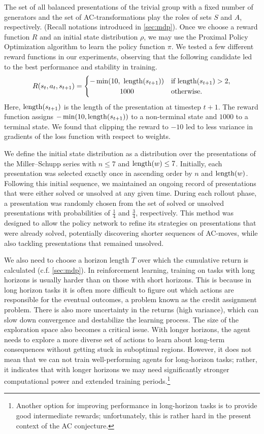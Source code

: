 The set of all balanced presentations of the trivial group with a fixed number of generators and the set of AC-transformations play the roles of sets $S$ and $A$, respectively. (Recall notations introduced in \cref{sec:mdp}). Once we choose a reward function $R$ and an initial state distribution $\rho$, we may use the Proximal Policy Optimization algorithm to learn the policy function $\pi$. We tested a few different reward functions in our experiments, observing that the following candidate led to the best performance and stability in training.
\[
R(s_{t}, a_{t}, s_{t+1}) =
\begin{cases}
	-\min(10, \ \length(s_{t+1})) & \text{if length}(s_{t+1}) > 2, \\
	\hfil 1000 & \text{otherwise.}
\end{cases}
\]
Here, $\operatorname{length}(s_{t+1})$ is the length of the presentation at timestep $t+1$. The reward function assigns $-\min(10, \operatorname{length}(s_{t+1}))$ to a non-terminal state and $1000$ to a terminal state. We found that clipping the reward to $-10$ led to less variance in gradients of the loss function with respect to weights.

We define the initial state distribution as a distribution over the presentations of the Miller--Schupp series with $n \leq 7$ and $\operatorname{length}(w) \leq 7$. Initially, each presentation was selected exactly once in ascending order by $n$ and $\operatorname{length}(w)$. Following this initial sequence, we maintained an ongoing record of presentations that were either solved or unsolved at any given time. During each rollout phase, a presentation was randomly chosen from the set of solved or unsolved presentations with probabilities of $\frac{1}{4}$ and $\frac{3}{4}$, respectively. This method was designed to allow the policy network to refine its strategies on presentations that were already solved, potentially discovering shorter sequences of AC-moves, while also tackling presentations that remained unsolved.

We also need to choose a horizon length $T$ over which the cumulative return is calculated (c.f. \cref{sec:mdp}). In reinforcement learning, training on tasks with long horizons is usually harder than on those with short horizons. This is because in long horizon tasks it is often more difficult to figure out which actions are responsible for the eventual outcomes, a problem known as the credit assignment problem. There is also more uncertainty in the returns (high variance), which can slow down convergence and destabilize the learning process. The size of the exploration space also becomes a critical issue. With longer horizons, the agent needs to explore a more diverse set of actions to learn about long-term consequences without getting stuck in suboptimal regions. However, it does not mean that we can not train well-performing agents for long-horizon tasks; rather, it indicates that with longer horizons we may need significantly stronger computational power and extended training periods.\footnote{Another option for improving performance in long-horizon tasks is to provide good intermediate rewards; unfortunately, this is rather hard in the present context of the AC conjecture.}


